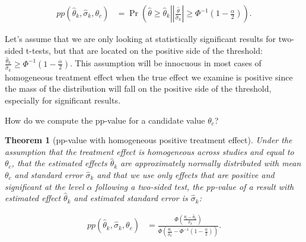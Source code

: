\documentclass[
]{book}
\newtheorem{theorem}{Theorem}[chapter]
\theoremstyle{definition}
\theoremstyle{definition}
\theoremstyle{definition}
\theoremstyle{definition}
\theoremstyle{remark}
\begin{document}
\begin{align*}
  pp(\hat{\theta}_k,\hat{\sigma}_k,\theta_c) & = \Pr\left(\hat{\theta}\geq\hat{\theta}_k\left|
                                            \left|\frac{\hat{\theta}}{\hat{\sigma}_k}\right|
                                            \geq\Phi^{-1}\left(1-\frac{\alpha}{2}\right)\right.\right).
\end{align*}

Let's assume that we are only looking at statistically significant results for two-sided t-tests, but that are located on the positive side of the threshold: \(\frac{\hat{\theta}_k}{\hat{\sigma}_k}\geq\Phi^{-1}\left(1-\frac{\alpha}{2}\right)\).
This assumption will be innocuous in most cases of homogeneous treatment effect when the true effect we examine is positive since the mass of the distribution will fall on the positive side of the threshold, especially for significant results.

How do we compute the pp-value for a candidate value \(\theta_c\)?

\begin{theorem}[pp-value with homogeneous positive treatment effect]
\protect\hypertarget{thm:ppvalueHomogPos}{}{\label{thm:ppvalueHomogPos} \iffalse (pp-value with homogeneous positive treatment effect) \fi{} }Under the assumption that the treatment effect is homogeneous across studies and equal to \(\theta_c\), that the estimated effects \(\hat{\theta}_k\) are approximately normally distributed with mean \(\theta_c\) and standard error \(\hat{\sigma}_k\) and that we use only effects that are positive and significant at the level \(\alpha\) following a two-sided test, the pp-value of a result with estimated effect \(\hat{\theta}_k\) and estimated standard error is \(\hat{\sigma}_k\):

\begin{align*}
  pp(\hat{\theta}_k,\hat{\sigma}_k,\theta_c) & = \frac{\Phi\left(\frac{\theta_c-\hat{\theta}_k}{\hat{\sigma}_k}\right)}
                                                      {\Phi\left(\frac{\theta_c}{\hat{\sigma}_k}-\Phi^{-1}\left(1-\frac{\alpha}{2}\right)\right)}.
 \end{align*}
\end{theorem}
\end{document}
